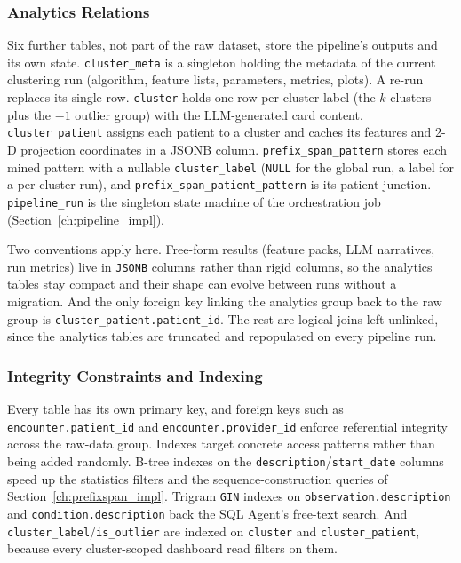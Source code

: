 \subsubsection*{Analytics Relations}

Six further tables, not part of the raw dataset, store the pipeline's outputs and its own state. \texttt{cluster\_meta} is a singleton holding the metadata of the current clustering run (algorithm, feature lists, parameters, metrics, plots). A re-run replaces its single row. \texttt{cluster} holds one row per cluster label (the $k$ clusters plus the $-1$ outlier group) with the LLM-generated card content. \texttt{cluster\_patient} assigns each patient to a cluster and caches its features and 2-D projection coordinates in a JSONB column. \texttt{prefix\_span\_pattern} stores each mined pattern with a nullable \texttt{cluster\_label} (\texttt{NULL} for the global run, a label for a per-cluster run), and \texttt{prefix\_span\_patient\_pattern} is its patient junction. \texttt{pipeline\_run} is the singleton state machine of the orchestration job (Section~\ref{ch:pipeline_impl}).

Two conventions apply here. Free-form results (feature packs, LLM narratives, run metrics) live in \texttt{JSONB} columns rather than rigid columns, so the analytics tables stay compact and their shape can evolve between runs without a migration. And the only foreign key linking the analytics group back to the raw group is \texttt{cluster\_patient.patient\_id}. The rest are logical joins left unlinked, since the analytics tables are truncated and repopulated on every pipeline run.

\subsubsection*{Integrity Constraints and Indexing}

Every table has its own primary key, and foreign keys such as \texttt{encounter.patient\_id} and \texttt{encounter.provider\_id} enforce referential integrity across the raw-data group. Indexes target concrete access patterns rather than being added randomly. B-tree indexes on the \texttt{description}/\texttt{start\_date} columns speed up the statistics filters and the sequence-construction queries of Section~\ref{ch:prefixspan_impl}. Trigram \texttt{GIN} indexes on \texttt{observation.description} and \texttt{condition.description} back the SQL Agent's free-text search. And \texttt{cluster\_label}/\texttt{is\_outlier} are indexed on \texttt{cluster} and \texttt{cluster\_patient}, because every cluster-scoped dashboard read filters on them.

